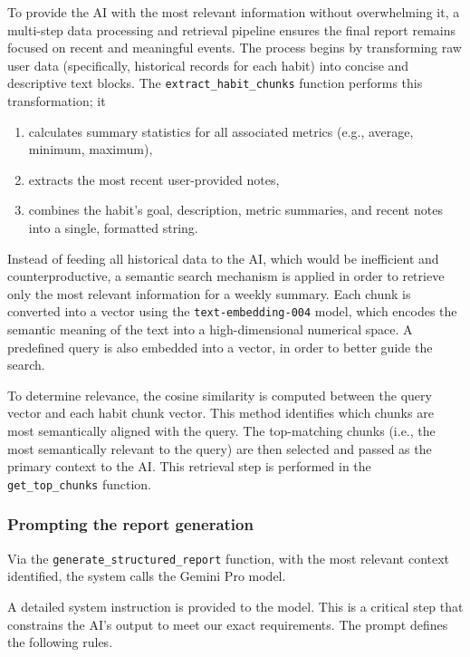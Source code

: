 \documentclass{article}
\begin{document}
To provide the AI with the most relevant information without overwhelming it, a multi-step data processing and retrieval pipeline ensures the final report remains focused on recent and meaningful events.
The process begins by transforming raw user data (specifically, historical records for each habit) into concise and descriptive text blocks.
The \verb|extract_habit_chunks| function performs this transformation; it

\begin{enumerate}
	\item calculates summary statistics for all associated metrics (e.g., average, minimum, maximum),
	\item extracts the most recent user-provided notes,
	\item combines the habit’s goal, description, metric summaries, and recent notes into a single, formatted string.
\end{enumerate}

Instead of feeding all historical data to the AI, which would be inefficient and counterproductive, a semantic search mechanism is applied in order to retrieve only the most relevant information for a weekly summary.
Each chunk is converted into a vector using the \verb|text-embedding-004| model, which encodes the semantic meaning of the text into a high-dimensional numerical space.
A predefined query is also embedded into a vector, in order to better guide the search.

To determine relevance, the cosine similarity is computed between the query vector and each habit chunk vector.
This method identifies which chunks are most semantically aligned with the query.
The top-matching chunks (i.e., the most semantically relevant to the query) are then selected and passed as the primary context to the AI.
This retrieval step is performed in the \verb|get_top_chunks| function.

\subsubsection{Prompting the report generation}

Via the \verb|generate_structured_report| function, with the most relevant context identified, the system calls the Gemini Pro model.

A detailed system instruction is provided to the model.
This is a critical step that constrains the AI’s output to meet our exact requirements.
The prompt defines the following rules.
\end{document}
